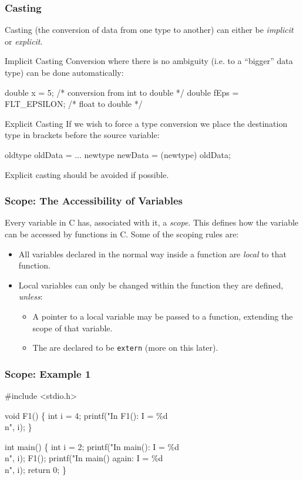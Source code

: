 \documentclass[table]{beamer}
\newif\ifschigh\schighfalse
\newcommand{\kw}[1]{\ifschigh\textcolor{red}{#1}\else\textcolor{keyword}{#1}\fi}
\newcommand{\kt}[1]{\ifschigh\textcolor{red}{#1}\else\textcolor{ctext}{#1}\fi}
\newcommand{\kc}[1]{\ifschigh\textcolor{red}{#1}\else\textcolor{comment}{#1}\fi}
\newcounter{sckll}
\newcommand{\kr}{\setcounter{sckll}{1}}
\newcommand{\kl}{}
\begin{document}
\begin{frame}[fragile]
\frametitle{Casting}
Casting (the conversion of data from one type to another) can either be \emph{implicit} or \emph{explicit}.
\begin{block}{Implicit Casting}
Conversion where there is no ambiguity (i.e. to a ``bigger'' data type) can be done automatically:
\begin{semiverbatim}
\small\kw{double} x = 5; \kc{/* conversion from int to double */}
\kw{double} fEps = FLT_EPSILON; \kc{/* float to double */}
\end{semiverbatim}
\end{block}

\begin{block}{Explicit Casting}
If we wish to force a type conversion we place the destination type in brackets before the source variable:
\begin{semiverbatim}
oldtype oldData = ...
newtype newData = (newtype) oldData;
\end{semiverbatim}
Explicit casting should be avoided if possible.
\end{block}
\end{frame}

\begin{frame}
\frametitle{Scope: The Accessibility of Variables}
Every variable in C has, associated with it, a \emph{scope}. This defines how the variable can be accessed by functions in C. Some of the scoping rules are:
\begin{itemize}
\item All variables declared in the normal way inside a function are \emph{local} to that function.
\item Local variables can only be changed within the function they are defined,
\emph{unless}:
\begin{itemize}
\item A pointer to a local variable may be passed to a function, extending the scope of that variable.
\item The are declared to be {\tt extern} (more on this later).
\end{itemize}
\end{itemize}
\end{frame}

\begin{frame}[fragile]
\frametitle{Scope: Example 1}
\vspace{-0.1in}
\begin{semiverbatim}
\kr\kl\kw{\#include} \kt{<stdio.h>}
\kl
\kl\kw{void} F1()
\kl\{
\kl   \kw{int} i = 4;
\kl   printf(\kt{"In F1(): I = \%d\\n"}, i);
\kl\}
\kl
\kl\kw{int} main()
\kl\{
\kl   \kw{int} i = 2;
\kl   printf(\kt{"In main(): I = \%d\\n"}, i);
\kl   F1();
\kl   printf(\kt{"In main() again: I = \%d\\n"}, i);
\kl   \kw{return} 0;
\kl\}
\end{semiverbatim}
\end{frame}
\end{document}

